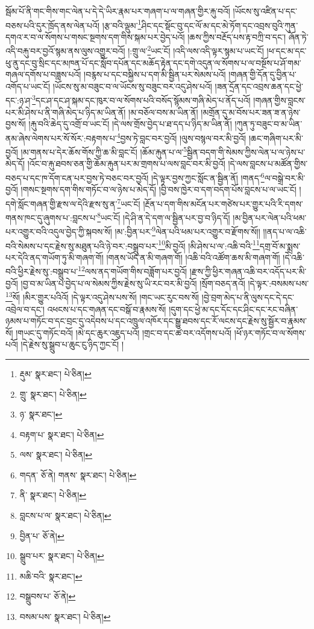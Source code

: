 སྦོམ་པོ་ནི་གང་གིས་གང་ལེན་པ་དེ་དེ་ཡིར་རྣམ་པར་གཞག་པ་ལ་གཞན་གྱིར་རྐུ་བའོ། །ཡོངས་སུ་འཛིན་པ་དང་བཅས་པའི་དུར་ཁྲོད་ནས་ལེན་པའོ། །རྩ་བའི་ལྡུམ་\footnote{རྡུམ་  སྣར་ཐང་།  པེ་ཅིན། }ཤིང་དང་སྡོང་བུ་དང་ལོ་མ་དང་མེ་ཏོག་དང་འབྲས་བུའི་ཀུན་དགའ་ར་བ་ལ་སོགས་པ་གསང་སྔགས་དག་གིས་སྐམ་པར་བྱེད་པའོ། །ཆས་ཀྱིས་བརྔོད་པས་རྟ་བཀྲི་བ་དང་། ཞོན་ཏེ་འདི་བརྐུ་བར་བྱའོ་སྙམ་ནས་ལུས་འགྱུར་བའོ། །:གྲུ་ལ་\footnote{གྲུ་  སྣར་ཐང་།  པེ་ཅིན། }ཡང་ངོ། །འདི་ལས་འདི་ལྟར་སྙམ་པ་ཡང་ངོ། །ཕ་དང་མ་དང་ཕུ་ནུ་དང་བུ་སྲིང་དང་མཁན་པོ་དང་སློབ་དཔོན་དང་མཆོད་རྟེན་དང་དགེ་འདུན་ལ་སོགས་པ་ལ་བསྔོས་པ་ཤོ་གམ་གཞལ་དགོས་པ་བཟླས་པའོ། །བརྙས་པ་དང་བསྐྱིས་པ་དག་མི་སྦྱིན་པར་སེམས་པའོ། །གཞན་གྱི་དོན་དུ་བྱིན་པ་འགོད་པ་ཡང་ངོ། །ཡོངས་སུ་མ་བཟུང་བ་ལ་ཡོངས་སུ་བཟུང་བར་འདུ་ཤེས་པའོ། །ཟན་དྲོན་དང་འབྲས་ཆན་དང་ཕྱེ་དང་:ཉ་ཤ་\footnote{ཉ་  སྣར་ཐང་། }དང་ཤ་དང་ཤ་སྐམ་དང་ཁུར་བ་ལ་སོགས་པའི་བསོད་སྙོམས་གཞི་མེད་པ་ནོད་པའོ། །གཞན་གྱིས་བླངས་པར་མི་ཤེས་པ་ནི་གཞི་མེད་པ་ཉིད་མ་ཡིན་ནོ། །མ་བཅོལ་བས་མ་ཡིན་ནོ། །མགྲོན་དུ་མ་བོས་པར་ཟན་ཟ་ན་ཉེས་བྱས་སོ། །རྐུ་བའི་ཆེད་དུ་འགྲོ་བ་ཡང་ངོ། །དེ་ལས་གྲོས་བྱེད་པ་ཐ་དད་པ་ཉིད་མ་ཡིན་ནོ། །ཀུན་ཏུ་བཟུང་བ་མ་ཡིན་ནམ་ཞེས་ལེགས་པར་སོ་སོར་:བརྟགས་པ་\footnote{བརྟག་པ་  སྣར་ཐང་།  པེ་ཅིན། }བྱས་ཏེ་བླང་བར་བྱའོ། །ལུས་བསྙལ་བར་མི་བྱའོ། །ཆང་གཞིག་པར་མི་བྱའོ། །མ་གནས་པ་དེར་ཆོས་གོས་ཀྱི་ཆ་མི་བླང་ངོ། །ཆོམ་རྐུན་པ་ལ་\footnote{ལས་  སྣར་ཐང་།  པེ་ཅིན། }སྦྱིན་བདག་གི་སེམས་ཀྱིས་ལེན་པ་ལ་ཉེས་པ་མེད་དོ། །འོང་བ་རྐུ་ཐབས་ཅན་གྱི་ཆོམ་རྐུན་པར་མ་གྲགས་པ་ལས་བླང་བར་མི་བྱའོ། །དེ་ལས་བླངས་པ་མཚོན་གྱིས་བཅད་པ་དང་ཁ་དོག་ངན་པར་བྱས་ཏེ་བཅང་བར་བྱའོ། །དེ་ལྟར་བྱས་ཀྱང་སློང་ན་སྦྱིན་ནོ། །གནད་\footnote{གདན་  ཅོ་ནེ། གནས་  སྣར་ཐང་།  པེ་ཅིན། }ལ་བསྒྲེ་བར་མི་བྱའོ། །གསང་སྔགས་དག་གིས་གཏོང་བ་ལ་ཉེས་པ་མེད་དོ། །བྱི་བས་ཁྱེར་བ་དག་བདག་པོས་བླངས་པ་ལ་ཡང་ངོ། །དགེ་སློང་གཞན་གྱི་རྫས་ལ་དེའི་རྫས་སུ་ན་\footnote{ནི་  སྣར་ཐང་།  པེ་ཅིན། }ཡང་ངོ། །རྔོན་པ་དག་གིས་མངོན་པར་གཙེས་པར་གྱུར་པའི་རི་དགས་གནས་ཁང་དུ་ཞུགས་པ་:བླངས་པ་\footnote{བླངས་པ་ལ་  སྣར་ཐང་།  པེ་ཅིན། }ཡང་ངོ། །དེ་ཤི་ན་དེ་དག་ལ་སྦྱིན་པར་བྱ་བ་ཉིད་དོ། །མ་བྱིན་པར་ལེན་པའི་ཕམ་པར་འགྱུར་བའི་འདུལ་བྱེད་ཀྱི་སྐབས་སོ། །མ་:བྱིན་པར་\footnote{བྱིན་པ་  ཅོ་ནེ། }ལེན་པའི་ཕམ་པར་འགྱུར་བ་རྫོགས་སོ།། །།ནད་པ་ལ་འཆི་བའི་སེམས་པ་དང་རྗེས་སུ་མཐུན་པའི་ཉེ་བར་:བསྒྲུབ་པར་\footnote{སྒྲུབ་པར་  སྣར་ཐང་།  པེ་ཅིན། }མི་བྱའོ། །མི་ཤེས་པ་ལ་:འཆི་བའི་\footnote{མཆི་བའི་  སྣར་ཐང་། }དགྲ་བོ་མ་སྨྲས་པར་དེའི་ནད་གཡོག་ཏུ་མི་གཞག་གོ། །གནས་ཡོད་ན་མི་གཞག་གོ། །འཆི་བའི་འཚོག་ཆས་མི་གཞག་གོ། །དེ་འཆི་བའི་ཕྱིར་རྗེས་སུ་:བསྒྲུབ་པ་\footnote{བསྒྲུབས་པ་  ཅོ་ནེ། }ལས་ནད་གཡོག་གིས་བཟློག་པར་བྱའོ། །རྫས་ཀྱི་ཕྱིར་གཞན་འཆི་བར་འདོད་པར་མི་བྱའོ། །བྱ་བ་མ་ཡིན་པ་བྱེད་པ་ལ་སེམས་ཀྱིས་རྗེས་སུ་ཡི་རང་བར་མི་བྱའོ། །སྲོག་བཅད་ནའོ། །དེ་ལྟར་:བསམས་པས་\footnote{བསམ་པས་  སྣར་ཐང་།  པེ་ཅིན། }སོ། །མིར་གྱུར་པའིའོ། །དེ་ལྟར་འདུ་ཤེས་པས་སོ། །གང་ཡང་རུང་བས་སོ། །བྱེ་བྲག་མེད་པ་ནི་ལུས་དང་དེ་དང་འབྲེལ་བ་དང་། འཕངས་པ་དང་གཞན་དང་བསྒོ་བ་རྣམས་སོ། །དུག་དང་ཕྱེ་མ་དང་དོང་དང་ཤིང་དང་རང་བཞིན་ཉམས་པ་གཏོང་བ་དང་བྲང་དུ་འདེབས་པ་དང་འཁྲུལ་འཁོར་དང་སྒྱུ་ཐབས་དང་རོ་ལངས་དང་རྗེས་སུ་སྦྱོར་བ་རྣམས་སོ། །གཡང་དུ་གཏོང་བའོ། །མེ་དང་ཆུར་འཇུད་པའོ། །གྲང་བ་དང་ཚ་བར་འདོགས་པའོ། །ཕོ་ཉར་གཏོང་བ་ལ་སོགས་པའོ། །དེ་རྗེས་སུ་སྒྲུབ་པ་ཆུང་ངུ་ཉིད་ཀྱང་ངོ། །
